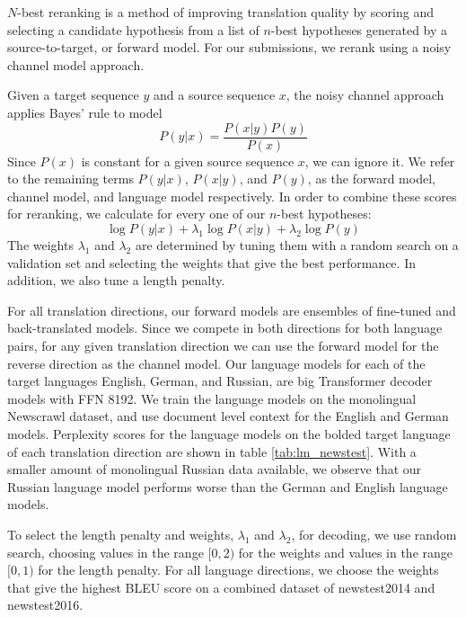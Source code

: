 \documentclass[11pt,a4paper]{article}
\begin{document}
$N$-best reranking is a method of improving translation quality by scoring and selecting a candidate hypothesis from a list of $n$-best hypotheses generated by a source-to-target, or forward model.
For our submissions, we rerank using a noisy channel model approach.

Given a target sequence $y$ and a source sequence $x$, the noisy channel approach applies Bayes' rule to model 
\begin{equation}
    P(y|x) = \frac{P(x|y)P(y)}{P(x)}
\end{equation}
Since $P(x)$ is constant for a given source sequence $x$, we can ignore it.
We refer to the remaining terms $P(y|x)$, $P(x|y)$, and $P(y)$, as the forward model, channel model, and language model respectively. 
In order to combine these scores for reranking, we calculate for every one of our $n$-best hypotheses:
\begin{equation}
    \log P(y|x) + \lambda_1 \log P(x|y) + \lambda_2 \log P(y) 
\end{equation} 
The weights $\lambda_1$ and $\lambda_2$ are determined by tuning them with a random search on a validation set and selecting the weights that give the best performance.
In addition, we also tune a length penalty.

For all translation directions, our forward models are ensembles of fine-tuned and back-translated models.
Since we compete in both directions for both language pairs, for any given translation direction we can use the forward model for the reverse direction as the channel model.
Our language models for each of the target languages English, German, and Russian, are big Transformer decoder models with FFN 8192.
We train the language models on the monolingual Newscrawl dataset, and use document level context for the English and German models. 
Perplexity scores for the language models on the bolded target language of each translation direction are shown in table \ref{tab:lm_newstest}.
With a smaller amount of monolingual Russian data available, we observe that our Russian language model performs worse than the German and English language models.

To select the length penalty and weights, $\lambda_1$ and $\lambda_2$, for decoding, we use random search, choosing values in the range $[0, 2)$ for the weights and values in the range $[0, 1)$ for the length penalty.
For all language directions, we choose the weights that give the highest BLEU score on a combined dataset of newstest2014 and newstest2016.
\end{document}
